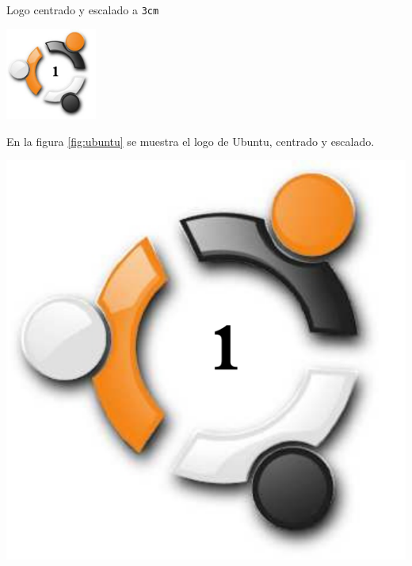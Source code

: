 \documentclass {article} %
\begin{document}
	Logo centrado y escalado a {\tt 3cm}
	\begin{center}
		\includegraphics[width =3cm]{images/ubuntu1}
	\end{center}
	En la figura \ref{fig:ubuntu} se
	muestra el logo de Ubuntu, centrado y
	escalado.\\
	\begin{center}
		\includegraphics[scale=0.2]{images/ubuntu1}
		\label{fig:
			ubuntu}
	\end{center}
\end{document}

